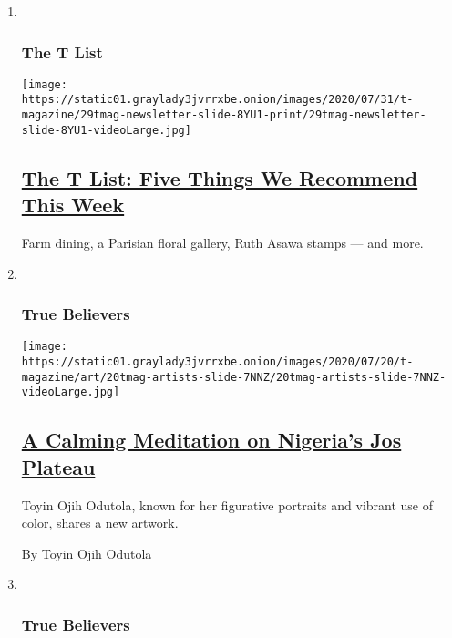 \begin{enumerate}
\def\labelenumi{\arabic{enumi}.}
\item ~
  \hypertarget{the-t-list}{%
  \subsubsection{The T List}\label{the-t-list}}

  \texttt{[image: https://static01.graylady3jvrrxbe.onion/images/2020/07/31/t-magazine/29tmag-newsletter-slide-8YU1-print/29tmag-newsletter-slide-8YU1-videoLarge.jpg]}

  \hypertarget{the-t-list-five-things-we-recommend-this-week}{%
  \subsection{\texorpdfstring{\href{/2020/07/30/t-magazine/the-t-list-five-things-we-recommend-this-week.html}{The
  T List: Five Things We Recommend This
  Week}}{The T List: Five Things We Recommend This Week}}\label{the-t-list-five-things-we-recommend-this-week}}

  Farm dining, a Parisian floral gallery, Ruth Asawa stamps --- and
  more.
\item ~
  \hypertarget{true-believers}{%
  \subsubsection{True Believers}\label{true-believers}}

  \texttt{[image: https://static01.graylady3jvrrxbe.onion/images/2020/07/20/t-magazine/art/20tmag-artists-slide-7NNZ/20tmag-artists-slide-7NNZ-videoLarge.jpg]}

  \hypertarget{a-calming-meditation-on-nigerias-jos-plateau}{%
  \subsection{\texorpdfstring{\href{/2020/07/22/t-magazine/toyin-ojih-odutola.html}{A
  Calming Meditation on Nigeria's Jos
  Plateau}}{A Calming Meditation on Nigeria's Jos Plateau}}\label{a-calming-meditation-on-nigerias-jos-plateau}}

  Toyin Ojih Odutola, known for her figurative portraits and vibrant use
  of color, shares a new artwork.

  By Toyin Ojih Odutola
\item ~
  \hypertarget{true-believers-1}{%
  \subsubsection{True Believers}\label{true-believers-1}}


\end{enumerate}
